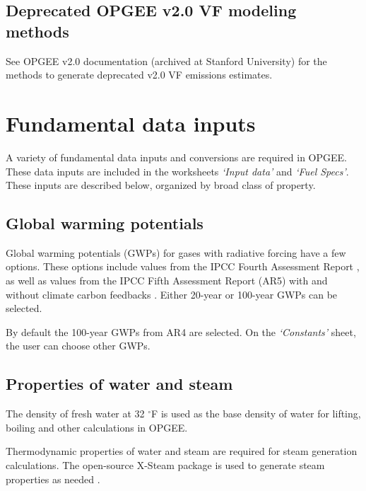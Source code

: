 \documentclass[11pt]{report}
\newcommand{\sheet}[1]{\textit{`{#1}'}}
\begin{document}
\section{Deprecated OPGEE v2.0 VF modeling methods}

See OPGEE v2.0 documentation (archived at Stanford University) for the methods to generate deprecated v2.0 VF emissions estimates.


\chapter{Fundamental data inputs}\label{sec:data_inputs}

A variety of fundamental data inputs and conversions are required in OPGEE. These data inputs are included in the worksheets \sheet{Input data} and \sheet{Fuel Specs}. These inputs are described below, organized by broad class of property.


\section{Global warming potentials} \label{sec:GWPs}

Global warming potentials (GWPs) for gases with radiative forcing have a few options. These options include values from the IPCC Fourth Assessment Report \cite{IPCC2007}, as well as values from the IPCC Fifth Assessment Report (AR5) with and without climate carbon feedbacks \cite{IPCC2013}. Either 20-year or 100-year GWPs can be selected. 

By default the 100-year GWPs from AR4 are selected. On the \sheet{Constants} sheet, the user can choose other GWPs.


\section{Properties of water and steam}
The density of fresh water at 32 $^\circ$F is used as the base density of water for lifting, boiling and other calculations in OPGEE. 

Thermodynamic properties of water and steam are required for steam generation calculations. The open-source X-Steam package is used to generate steam properties as needed \cite{xsteam}.
\end{document}
